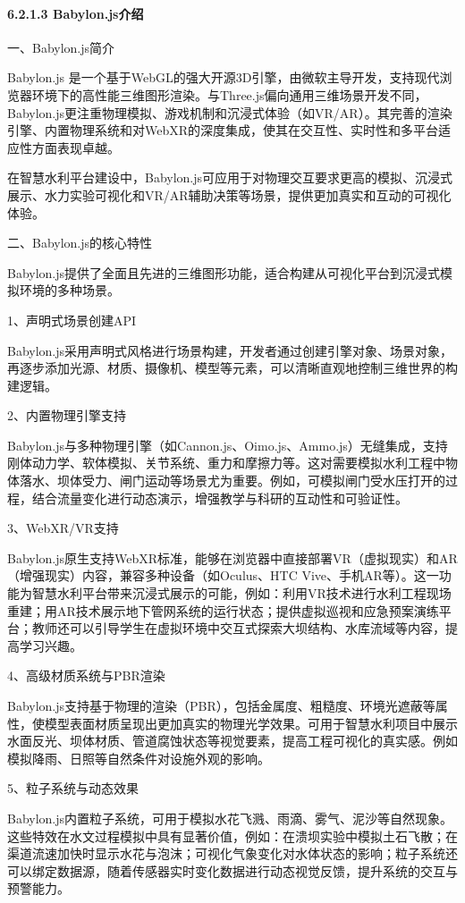 \paragraph{6.2.1.3 Babylon.js介绍}\label{babylon.jsux4ecbux7ecd}

一、Babylon.js简介

Babylon.js 是一个基于WebGL的强大开源3D引擎，由微软主导开发，支持现代浏览器环境下的高性能三维图形渲染。与Three.js偏向通用三维场景开发不同，Babylon.js更注重物理模拟、游戏机制和沉浸式体验（如VR/AR）。其完善的渲染引擎、内置物理系统和对WebXR的深度集成，使其在交互性、实时性和多平台适应性方面表现卓越。

在智慧水利平台建设中，Babylon.js可应用于对物理交互要求更高的模拟、沉浸式展示、水力实验可视化和VR/AR辅助决策等场景，提供更加真实和互动的可视化体验。

二、Babylon.js的核心特性

Babylon.js提供了全面且先进的三维图形功能，适合构建从可视化平台到沉浸式模拟环境的多种场景。

1、声明式场景创建API

Babylon.js采用声明式风格进行场景构建，开发者通过创建引擎对象、场景对象，再逐步添加光源、材质、摄像机、模型等元素，可以清晰直观地控制三维世界的构建逻辑。

2、内置物理引擎支持

Babylon.js与多种物理引擎（如Cannon.js、Oimo.js、Ammo.js）无缝集成，支持刚体动力学、软体模拟、关节系统、重力和摩擦力等。这对需要模拟水利工程中物体落水、坝体受力、闸门运动等场景尤为重要。例如，可模拟闸门受水压打开的过程，结合流量变化进行动态演示，增强教学与科研的互动性和可验证性。

3、WebXR/VR支持

Babylon.js原生支持WebXR标准，能够在浏览器中直接部署VR（虚拟现实）和AR（增强现实）内容，兼容多种设备（如Oculus、HTC Vive、手机AR等）。这一功能为智慧水利平台带来沉浸式展示的可能，例如：利用VR技术进行水利工程现场重建；用AR技术展示地下管网系统的运行状态；提供虚拟巡视和应急预案演练平台；教师还可以引导学生在虚拟环境中交互式探索大坝结构、水库流域等内容，提高学习兴趣。

4、高级材质系统与PBR渲染

Babylon.js支持基于物理的渲染（PBR），包括金属度、粗糙度、环境光遮蔽等属性，使模型表面材质呈现出更加真实的物理光学效果。可用于智慧水利项目中展示水面反光、坝体材质、管道腐蚀状态等视觉要素，提高工程可视化的真实感。例如模拟降雨、日照等自然条件对设施外观的影响。

5、粒子系统与动态效果

Babylon.js内置粒子系统，可用于模拟水花飞溅、雨滴、雾气、泥沙等自然现象。这些特效在水文过程模拟中具有显著价值，例如：在溃坝实验中模拟土石飞散；在渠道流速加快时显示水花与泡沫；可视化气象变化对水体状态的影响；粒子系统还可以绑定数据源，随着传感器实时变化数据进行动态视觉反馈，提升系统的交互与预警能力。

